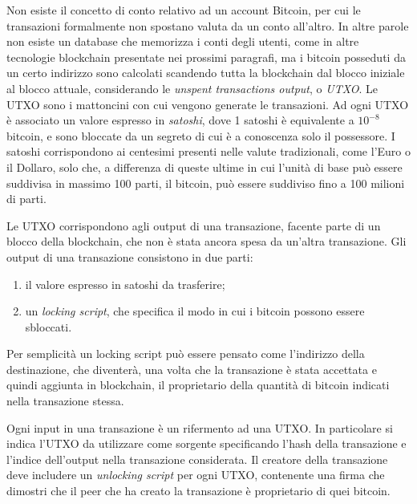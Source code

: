 Non esiste il concetto di conto relativo ad un account Bitcoin, per cui le transazioni formalmente non spostano valuta da un conto all'altro. In altre parole non esiste un database che memorizza i conti degli utenti, come in altre tecnologie blockchain presentate nei prossimi paragrafi, ma i bitcoin posseduti da un certo indirizzo sono calcolati scandendo tutta la blockchain dal blocco iniziale al blocco attuale, considerando le \emph{unspent transactions output}, o \textit{UTXO}. Le UTXO sono i mattoncini con cui vengono generate le transazioni. Ad ogni UTXO è associato un valore espresso in \emph{satoshi}, dove 1 satoshi è equivalente a $10^{-8}$ bitcoin, e sono bloccate da un segreto di cui è a conoscenza solo il possessore. I satoshi corrispondono ai centesimi presenti nelle valute tradizionali, come l'Euro o il Dollaro, solo che, a differenza di queste ultime in cui l'unità di base può essere suddivisa in massimo 100 parti, il bitcoin, può essere suddiviso fino a 100 milioni di parti.

Le UTXO corrispondono agli output di una transazione, facente parte di un blocco della blockchain, che non è stata ancora spesa da un'altra transazione. Gli output di una transazione consistono in due parti:

\begin{enumerate}
	\item il valore espresso in satoshi da trasferire;
	\item un \emph{locking script}, che specifica il modo in cui i bitcoin possono essere sbloccati.
\end{enumerate}

Per semplicità un locking script può essere pensato come l'indirizzo della destinazione, che diventerà, una volta che la transazione è stata accettata e quindi aggiunta in blockchain, il proprietario della quantità di bitcoin indicati nella transazione stessa.

Ogni input in una transazione è un rifermento ad una UTXO. In particolare si indica l'UTXO da utilizzare come sorgente specificando l'hash della transazione e l'indice dell'output nella transazione considerata. Il creatore della transazione deve includere un \emph{unlocking script} per ogni UTXO, contenente una firma che dimostri che il peer che ha creato la transazione è proprietario di quei bitcoin.

